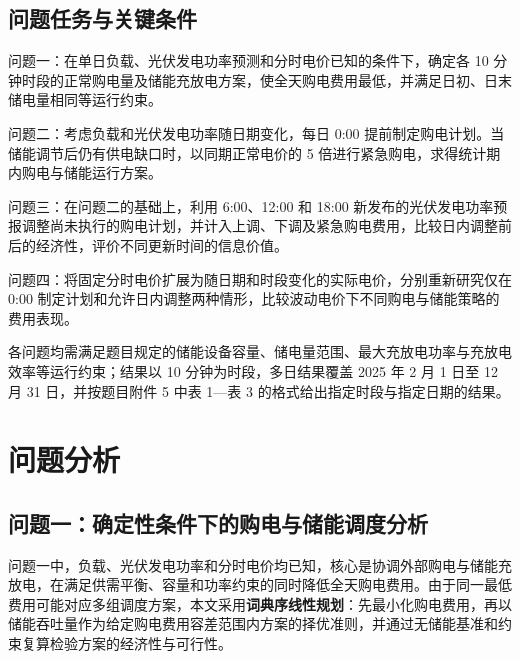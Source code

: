 \documentclass[12pt,a4paper]{ctexart}
\renewcommand{\textbf}[1]{{\CJKfamily{heiti}\bfseries #1}}
\begin{document}
\subsection{问题任务与关键条件}
问题一：在单日负载、光伏发电功率预测和分时电价已知的条件下，确定各 10 分钟时段的正常购电量及储能充放电方案，使全天购电费用最低，并满足日初、日末储电量相同等运行约束。
\par\noindent\hspace*{2em}问题二：考虑负载和光伏发电功率随日期变化，每日 0:00 提前制定购电计划。当储能调节后仍有供电缺口时，以同期正常电价的 5 倍进行紧急购电，求得统计期内购电与储能运行方案。
\par\noindent\hspace*{2em}问题三：在问题二的基础上，利用 6:00、12:00 和 18:00 新发布的光伏发电功率预报调整尚未执行的购电计划，并计入上调、下调及紧急购电费用，比较日内调整前后的经济性，评价不同更新时间的信息价值。
\par\noindent\hspace*{2em}问题四：将固定分时电价扩展为随日期和时段变化的实际电价，分别重新研究仅在 0:00 制定计划和允许日内调整两种情形，比较波动电价下不同购电与储能策略的费用表现。

\par\noindent\hspace*{2em}各问题均需满足题目规定的储能设备容量、储电量范围、最大充放电功率与充放电效率等运行约束；结果以 10 分钟为时段，多日结果覆盖 2025 年 2 月 1 日至 12 月 31 日，并按题目附件 5 中表 1—表 3 的格式给出指定时段与指定日期的结果。

\titlespacing*{\section}{0pt}{2.5em}{0.6em}
\section{问题分析}
\subsection{问题一：确定性条件下的购电与储能调度分析}
问题一中，负载、光伏发电功率和分时电价均已知，核心是协调外部购电与储能充放电，在满足供需平衡、容量和功率约束的同时降低全天购电费用。由于同一最低费用可能对应多组调度方案，本文采用\textbf{词典序线性规划}：先最小化购电费用，再以储能吞吐量作为给定购电费用容差范围内方案的择优准则，并通过无储能基准和约束复算检验方案的经济性与可行性。
\end{document}
